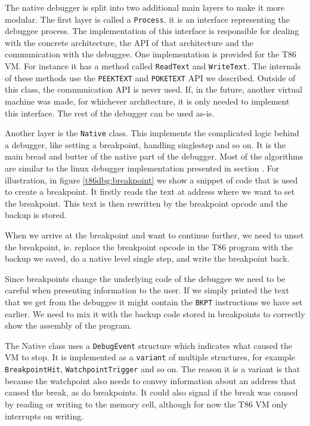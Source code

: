 The native debugger is split into two additional main layers to make it more
modular. The first layer is called a \texttt{Process}, it is an interface
representing the debuggee process. The implementation of this interface is
responsible for dealing with the concrete architecture, the API of that
architecture and the communication with the debuggee. One implementation is
provided for the T86 VM. For instance it has a method called \texttt{ReadText}
and \texttt{WriteText}. The internals of these methods use the
\texttt{PEEKTEXT} and \texttt{POKETEXT} API we described. Outside of this
class, the communication API is never used. If, in the future, another virtual
machine was made, for whichever architecture, it is only needed to implement
this interface. The rest of the debugger can be used as-is.

Another layer is the \texttt{Native} class. This implements the complicated
logic behind a debugger, like setting a breakpoint, handling singlestep and so
on. It is the main bread and butter of the native part of the debugger. Most of
the algorithms are similar to the linux debugger implementation presented in
section . For illustration, in figure \ref{t86dbg:breakpoint} we show
a snippet of code that is used to create a breakpoint. It firstly reads the
text at address where we want to set the breakpoint. This text is then
rewritten by the breakpoint opcode and the backup is stored.

When we arrive at the breakpoint and want to continue further, we need to unset
the breakpoint, ie. replace the breakpoint opcode in the T86 program with the
backup we saved, do a native level single step, and write the breakpoint back.

Since breakpoints change the underlying code of the debuggee we need to be
careful when presenting information to the user. If we simply printed the text
that we get from the debuggee it might contain the \texttt{BKPT} instructions
we have set earlier. We need to mix it with the backup code stored in
breakpoints to correctly show the assembly of the program.

The Native class uses a \texttt{DebugEvent} structure which indicates what
caused the VM to stop. It is implemented as a \texttt{variant} of multiple
structures, for example \texttt{BreakpointHit}, \texttt{WatchpointTrigger} and
so on. The reason it is a variant is that because the watchpoint also needs to
convey information about an address that caused the break, as do breakpoints.
It could also signal if the break was caused by reading or writing to the
memory cell, although for now the T86 VM only interrupts on writing.

